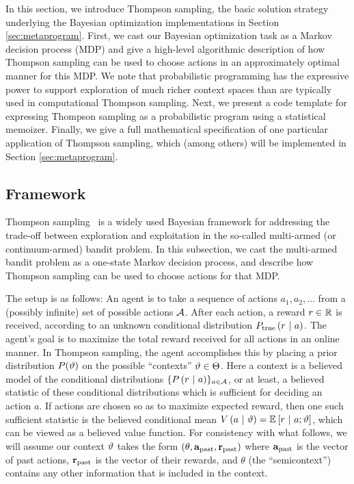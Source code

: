 \label{sec:thompson}
In this section, we introduce Thompson sampling, the basic solution strategy
underlying the Bayesian optimization implementations in Section
\ref{sec:metaprogram}.  First, we cast our Bayesian optimization task as a
Markov decision process (MDP) and give a high-level algorithmic description of
how Thompson sampling can be used to choose actions in an approximately optimal
manner for this MDP.  We note that probabilistic programming has the expressive
power to support exploration of much richer context spaces than are typically
used in computational Thompson sampling.  Next, we present a code template for
expressing Thompson sampling as a probabilistic program using a statistical
memoizer.  Finally, we give a full mathematical specification of one particular
application of Thompson sampling, which (among others) will be implemented in
Section \ref{sec:metaprogram}.

\subsection{Framework}\label{sec:thompson-framework}
Thompson sampling~\cite{thompson1933likelihood} is a widely used Bayesian
framework for addressing the trade-off between exploration and exploitation in
the so-called multi-armed (or continuum-armed) bandit problem.  In this
subsection, we cast the multi-armed bandit problem as a one-state Markov
decision process, and describe how Thompson sampling can be used to choose
actions for that MDP.

The setup is as follows: An agent is to take a sequence of actions $a_1, a_2,
\ldots$ from a (possibly infinite) set of possible actions $\mathcal{A}$.  After each
action, a reward $r \in \mathbb{R}$ is received, according to an unknown conditional
distribution $P_{\textrm{true}}\left( r \ \middle\vert\  a \right)$.  The agent's goal is to maximize the
total reward received for all actions in an online manner.  In Thompson
sampling, the agent accomplishes this by placing a prior distribution
$P(\vartheta)$ on the possible ``contexts'' $\vartheta \in \Theta$.  Here a context
is a believed model of the conditional distributions $\{P\left( r \ \middle\vert\  a \right)\}_{a
\in \mathcal{A}}$, or at least, a believed statistic of these conditional
distributions which is sufficient for deciding an action $a$.  If actions are
chosen so as to maximize expected reward, then one such sufficient statistic is
the believed conditional mean $V\left( a \ \middle\vert\  \vartheta \right) = \mathbb{E}_{}\left[ r \ \middle\vert\ 
a;\vartheta \right]$, which can be viewed as a believed value function.  For
consistency with what follows, we will assume our context $\vartheta$ takes the
form $(\theta, \mathbf{a}_{\textrm{past}}, \mathbf{r}_{\textrm{past}})$ where $\mathbf{a}_{\textrm{past}}$ is the vector of past
actions, $\mathbf{r}_{\textrm{past}}$ is the vector of their rewards, and $\theta$ (the
``semicontext'') contains any other information that is included in the context.

